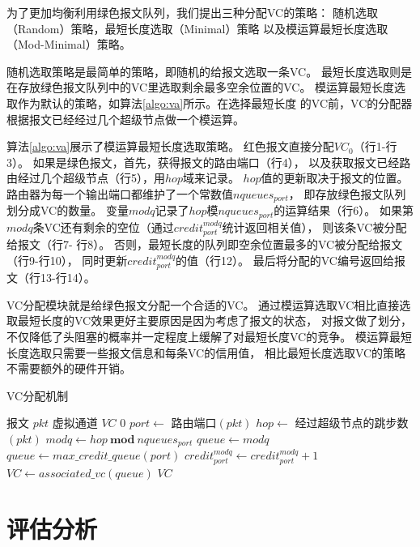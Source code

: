 为了更加均衡利用绿色报文队列，我们提出三种分配VC的策略：
随机选取（Random）策略，最短长度选取（Minimal）策略
以及模运算最短长度选取（Mod-Minimal）策略。

随机选取策略是最简单的策略，即随机的给报文选取一条VC。
最短长度选取则是在存放绿色报文队列中的VC里选取剩余最多空余位置的VC。
模运算最短长度选取作为默认的策略，如算法\ref{algo:va}所示。在选择最短长度
的VC前，VC的分配器根据报文已经经过几个超级节点做一个模运算。

算法\ref{algo:va}展示了模运算最短长度选取策略。
红色报文直接分配$VC_0$（行1-行3）。
如果是绿色报文，首先，获得报文的路由端口（行4），
以及获取报文已经路由经过几个超级节点（行5），用$hop$域来记录。
$hop$值的更新取决于报文的位置。
路由器为每一个输出端口都维护了一个常数值$nqueues_{port}$，
即存放绿色报文队列划分成VC的数量。
变量$modq$记录了$hop$模$nqueues_{port}$的运算结果（行6）。
如果第$modq$条VC还有剩余的空位（通过$credit_{port}^{modq}$统计返回相关值），
则该条VC被分配给报文（行7- 行8）。
否则，最短长度的队列即空余位置最多的VC被分配给报文（行9-行10），
同时更新$credit_{port}^{modq}$的值（行12）。
最后将分配的VC编号返回给报文（行13-行14）。

VC分配模块就是给绿色报文分配一个合适的VC。
通过模运算选取VC相比直接选取最短长度的VC效果更好主要原因是因为考虑了报文的状态，
对报文做了划分，不仅降低了头阻塞的概率并一定程度上缓解了对最短长度VC的竞争。
模运算最短长度选取只需要一些报文信息和每条VC的信用值，
相比最短长度选取VC的策略不需要额外的硬件开销。

\begin{algorithm}[t]
  \centering
  \caption{VC分配机制}
  \label{algo:va}
  \begin{algorithmic}[1]
    \REQUIRE 报文 $pkt$
    \ENSURE 虚拟通道  $VC$
    \RETURN $0$
    \ENDIF
    \STATE $port \leftarrow$ 路由端口$(pkt)$
    \STATE $hop \leftarrow$ 经过超级节点的跳步数$(pkt)$
    \STATE $modq \leftarrow hop\ \textbf{mod}\ nqueues_{port}$
    \STATE $queue \leftarrow modq$
    \ELSE
    \STATE $queue \leftarrow max\_credit\_queue(port)$
    \ENDIF
    \STATE $credit_{port}^{modq} \leftarrow credit_{port}^{modq} + 1$
    \STATE $VC \leftarrow associated\_vc(queue)$
    \RETURN $VC$
  \end{algorithmic}
\end{algorithm}

\section{评估分析}

